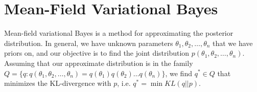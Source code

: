 
\section{Mean-Field Variational Bayes}\label{sec:mfvb}

Mean-field variational Bayes is a method for approximating the posterior distribution.  In general, we have unknown parameters $\theta_1, \theta_2, \ldots, \theta_n$ that we have priors on, and our objective is to find the joint distribution $p(\theta_1, \theta_2, \ldots, \theta_n)$.  Assuming that our approximate distribution is in the family $Q = \{q : q(\theta_1, \theta_2, \ldots, \theta_n) = q(\theta_1)q(\theta_2) \ldots q(\theta_n)\}$, we find $q^* \in Q$ that minimizes the KL-divergence with $p$, i.e. $q^* = \min KL(q || p)$.